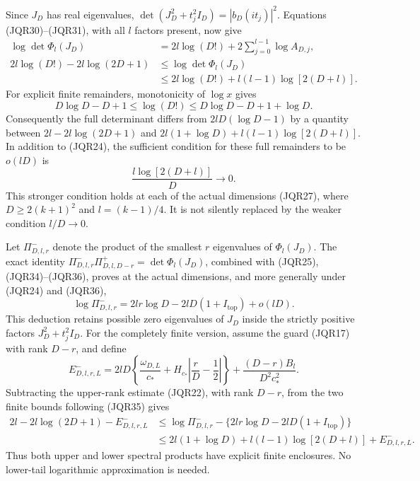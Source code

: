 Since \(J_D\) has real eigenvalues,
\(\det(J_D^2+t_j^2I_D)=|b_D(it_j)|^2\).
Equations (JQR30)--(JQR31), with all \(l\) factors present, now give
\[
 \begin{split}
 \log\det\Phi_l(J_D)
   &=2l\log(D!)+2\sum_{j=0}^{l-1}\log A_{D,j},\\
 2l\log(D!)-2l\log(2D+1)
   &\leq\log\det\Phi_l(J_D)\\
   &\leq2l\log(D!)+l(l-1)\log[2(D+l)].
 \end{split}
 \tag{JQR34}
\]
For explicit finite remainders, monotonicity of \(\log x\) gives
\[
 D\log D-D+1\leq\log(D!)
       \leq D\log D-D+1+\log D.
 \tag{JQR35}
\]
Consequently the full determinant differs from
\(2lD(\log D-1)\) by a quantity between
\(2l-2l\log(2D+1)\) and
\(2l(1+\log D)+l(l-1)\log[2(D+l)]\).
In addition to (JQR24), the sufficient condition for these full
remainders to be \(o(lD)\) is
\[
 \frac{l\log[2(D+l)]}{D}\longrightarrow0.
 \tag{JQR36}
\]
This stronger condition holds at each of the actual dimensions
(JQR27), where \(D\geq2(k+1)^2\) and \(l=(k-1)/4\).
It is not silently replaced by the weaker condition \(l/D\to0\).

Let \(\Pi^-_{D,l,r}\) denote the product of the smallest \(r\)
eigenvalues of \(\Phi_l(J_D)\).
The exact identity
\(\Pi^-_{D,l,r}\Pi^+_{D,l,D-r}=\det\Phi_l(J_D)\),
combined with (JQR25), (JQR34)--(JQR36), proves at the actual
dimensions, and more generally under (JQR24) and (JQR36),
\[
 \boxed{\displaystyle
 \log\Pi^-_{D,l,r}
   =2lr\log D-2lD(1+I_{\mathrm{top}})+o(lD).}
 \tag{JQR37}
\]
This deduction retains possible zero eigenvalues of \(J_D\) inside
the strictly positive factors \(J_D^2+t_j^2I_D\).
For the completely finite version, assume the guard (JQR17) with
rank \(D-r\), and define
\[
 E^-_{D,l,r,L}
 =2lD\left\{\frac{\omega_{D,L}}{c_*}+
           H_{c_*}\left|\frac rD-\frac12\right|\right\}
       +\frac{(D-r)B_l}{D^2c_*^2}.
 \tag{JQR38}
\]
Subtracting the upper-rank estimate (JQR22), with rank \(D-r\),
from the two finite bounds following (JQR35) gives
\[
 \begin{split}
 2l-2l\log(2D+1)-E^-_{D,l,r,L}
 &\leq
 \log\Pi^-_{D,l,r}
    -\{2lr\log D-2lD(1+I_{\mathrm{top}})\}\\
 &\leq
 2l(1+\log D)+l(l-1)\log[2(D+l)]+E^-_{D,l,r,L}.
 \end{split}
 \tag{JQR39}
\]
Thus both upper and lower spectral products have explicit finite
enclosures.  No lower-tail logarithmic approximation is needed.
